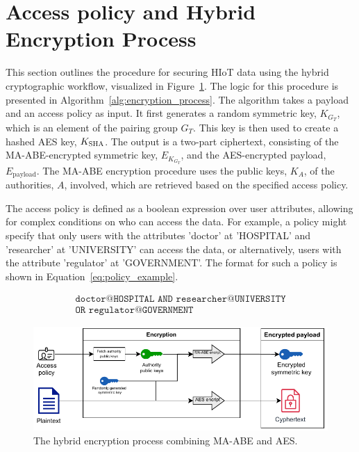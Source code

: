 \documentclass[cic,tc,english]{iiufrgs}
\numberwithin{algorithm}{chapter}
\begin{document}
    \section{Access policy and Hybrid Encryption Process}
        \label{sec:hybrid_encryption}

        This section outlines the procedure for securing HIoT data using the hybrid cryptographic workflow, visualized in Figure~\ref{fig:encryption_diagram}. The logic for this procedure is presented in Algorithm~\ref{alg:encryption_process}. The algorithm takes a payload and an access policy as input. It first generates a random symmetric key, $K_{G_T}$, which is an element of the pairing group $G_T$. This key is then used to create a hashed AES key, $K_{\textsc{SHA}}$. The output is a two-part ciphertext, consisting of the MA-ABE-encrypted symmetric key, $E_{K_{G_T}}$, and the AES-encrypted payload, $E_{\text{payload}}$. The MA-ABE encryption procedure uses the public keys, $K_A$, of the authorities, $A$, involved, which are retrieved based on the specified access policy. 

        The access policy is defined as a boolean expression over user attributes, allowing for complex conditions on who can access the data. For example, a policy might specify that only users with the attributes 'doctor' at 'HOSPITAL' and 'researcher' at 'UNIVERSITY' can access the data, or alternatively, users with the attribute 'regulator' at 'GOVERNMENT'. The format for such a policy is shown in Equation~\ref{eq:policy_example}.

        \begin{multline}
            \label{eq:policy_example}
            \texttt{doctor@HOSPITAL AND researcher@UNIVERSITY}\\
            \texttt{OR regulator@GOVERNMENT}
        \end{multline}

        \begin{figure}[h]
            \centering
            \includegraphics[width=\textwidth]{images/diagrams/encryption_diagram.pdf}
            \caption{The hybrid encryption process combining MA-ABE and AES.}
            \label{fig:encryption_diagram}
        \end{figure}
\end{document}
